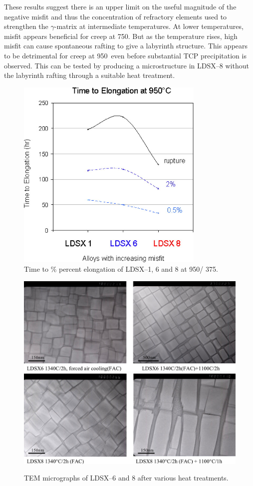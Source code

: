 These results suggest there is an upper limit on the useful magnitude of the negative misfit and thus the concentration of refractory elements used to strengthen the $\gamma$-matrix at intermediate temperatures.  At lower temperatures, misfit appears beneficial for creep at 750\celsius.  But as the temperature rises, high misfit can cause spontaneous rafting to give a labyrinth structure.  This appears to be detrimental for creep at 950\celsius\ even before substantial TCP precipitation is observed.  This can be tested by producing a microstructure in LDSX--8 without the labyrinth rafting through a suitable heat treatment.
%
\begin{figure}[H]
\begin{center}
\includegraphics[width=9cm]{LDSXCreep}
\caption{Time to \% percent elongation of LDSX--1, 6 and 8 at 950\celsius/ 375\mega\pascal.}
\label{fig:LDSXCreep}
\end{center}
\end{figure}
%
\begin{figure}[H]
\begin{center}
\includegraphics{LDSX6HT}
\includegraphics{LDSX8HT}
\caption{TEM micrographs of LDSX--6 and 8 after various heat treatments.}
\label{fig:LDSXHT}
\end{center}
\end{figure}
